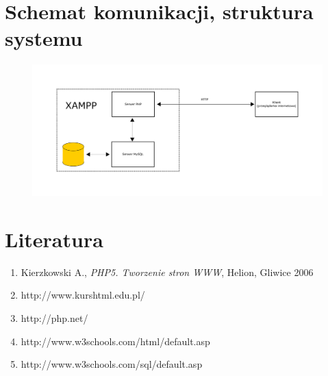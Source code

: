 \documentclass[a4paper, 11pt]{article}
\begin{document}
\section{Schemat komunikacji, struktura systemu}
\begin{figure}[h]
	\includegraphics[width=15cm]{schemat.png}
\end{figure}
\section{Literatura}
\begin{enumerate}
	\item Kierzkowski A., \textit{PHP5. Tworzenie stron WWW}, Helion, Gliwice 2006
	\item http://www.kurshtml.edu.pl/
	\item http://php.net/
	\item http://www.w3schools.com/html/default.asp
	\item http://www.w3schools.com/sql/default.asp
\end{enumerate}
\end{document}
